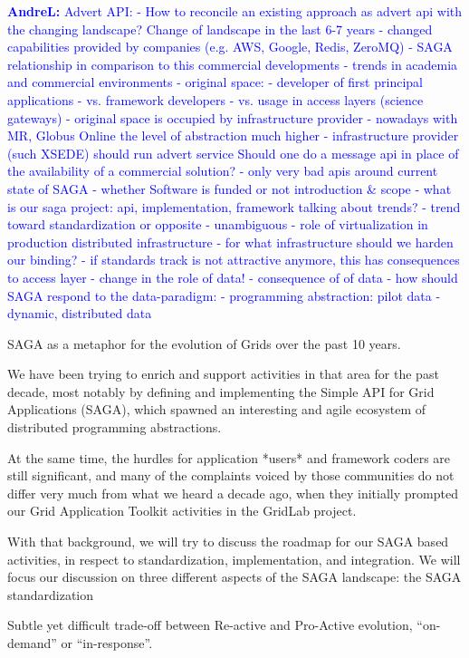 \documentclass{article}
\newcommand{\B}[1]{\textbf{#1}}
\newcommand{\alnote}[1]{{\textcolor{blue}{    \B{AndreL:  } #1 }}}
\newcommand{\alnote}[1]{}
\begin{document}
\alnote{Advert API: - How to reconcile an existing approach as advert
  api with the changing landscape?  Change of landscape in the last
  6-7 years - changed capabilities provided by companies (e.g. AWS,
  Google, Redis, ZeroMQ) - SAGA relationship in comparison to this
  commercial developments - trends in academia and commercial
  environments - original space: - developer of first principal
  applications - vs. framework developers - vs. usage in access layers
  (science gateways) - original space is occupied by infrastructure
  provider - nowadays with MR, Globus Online the level of abstraction
  much higher - infrastructure provider (such XSEDE) should run advert
  service Should one do a message api in place of the availability of
  a commercial solution?  - only very bad apis around current state of
  SAGA - whether Software is funded or not introduction \& scope -
  what is our saga project: api, implementation, framework talking
  about trends?  - trend toward standardization or opposite -
  unambiguous - role of virtualization in production distributed
  infrastructure - for what infrastructure should we harden our
  binding?  - if standards track is not attractive anymore, this has
  consequences to access layer - change in the role of data!  -
  consequence of of data - how should SAGA respond to the
  data-paradigm: - programming abstraction: pilot data - dynamic,
  distributed data }

SAGA as a metaphor for the evolution of Grids over the past 10 years.

We have been trying to enrich and support activities in that area for
the past decade, most notably by defining and implementing the Simple
API for Grid Applications (SAGA), which spawned an interesting and
agile ecosystem of distributed programming abstractions.

At the same time, the hurdles for application *users* and framework
coders are still significant, and many of the complaints voiced by
those communities do not differ very much from what we heard a decade
ago, when they initially prompted our Grid Application Toolkit
activities in the GridLab project.

With that background, we will try to discuss the roadmap for our SAGA
based activities, in respect to standardization, implementation, and
integration.  We will focus our discussion on three different aspects
of the SAGA landscape: the SAGA standardization

Subtle yet difficult trade-off between Re-active and Pro-Active
evolution, ``on-demand'' or ``in-response''.
\end{document}
